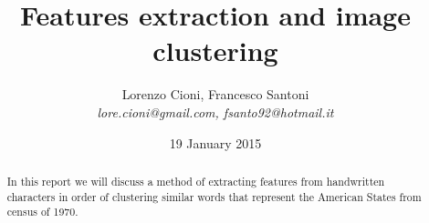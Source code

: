 \documentclass[a4paper,12pt]{article}
\title{\bf Features extraction and image clustering}
\date {19 January 2015}
\author{Lorenzo Cioni, Francesco Santoni\\\textit{{\small lore.cioni@gmail.com, fsanto92@hotmail.it}}}
\begin{document}
\maketitle

\begin{abstract}
In this report we will discuss a method of extracting features from handwritten characters in order of clustering similar words that represent the American States from census of 1970.
\end{abstract}

\tableofcontents









\end{document}
